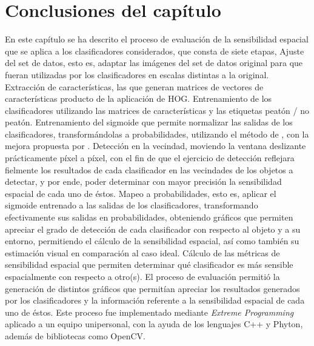 \section{Conclusiones del capítulo}

En este capítulo se ha descrito el proceso de evaluación de la sensibilidad espacial que se aplica a los clasificadores considerados, que consta de siete etapas, Ajuste del set de datos, esto es, adaptar las imágenes del set de datos original para que fueran utilizadas por los clasificadores en escalas distintas a la original. Extracción de características, las que generan matrices de vectores de características producto de la aplicación de HOG. Entrenamiento de los clasificadores utilizando las matrices de características y las etiquetas peatón / no peatón. Entrenamiento del sigmoide que permite normalizar las salidas de los clasificadores, transformándolas a probabilidades, utilizando el método de \cite{Platt1999}, con la mejora propuesta por \cite{Lin2000}. Detección en la vecindad, moviendo la ventana deslizante prácticamente píxel a píxel, con el fin de que el ejercicio de detección reflejara fielmente los resultados de cada clasificador en las vecindades de los objetos a detectar, y por ende, poder determinar con mayor precisión la sensibilidad espacial de cada uno de éstos. Mapeo a probabilidades, esto es, aplicar el sigmoide entrenado a las salidas de los clasificadores, transformando efectivamente sus salidas en probabilidades, obteniendo gráficos que permiten apreciar el grado de detección de cada clasificador con respecto al objeto y a su entorno, permitiendo el cálculo de la sensibilidad espacial, así como también su estimación visual en comparación al caso ideal. Cálculo de las métricas de sensibilidad espacial que permiten determinar qué clasificador es más sensible espacialmente con respecto a otro(s). 
El proceso de evaluación permitió la generación de distintos gráficos que permitían apreciar los resultados generados por los clasificadores y la información referente a la sensibilidad espacial de cada uno de éstos. Este proceso fue implementado mediante \textit{Extreme Programming} aplicado a un equipo unipersonal, con la ayuda de los lenguajes C++ y Phyton, además de bibliotecas como OpenCV.
